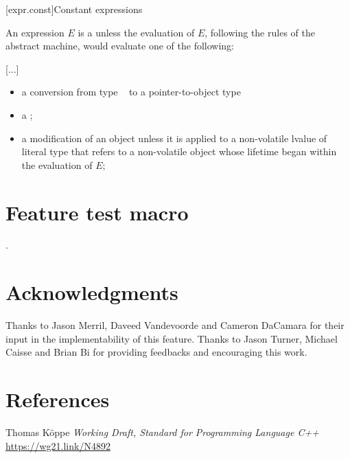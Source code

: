 \documentclass{wg21}
\begin{document}
    [expr.const]{Constant expressions}%

    \pnum
    An expression $E$ is a 
    unless the evaluation of $E$, following the rules of the abstract
    machine, would evaluate one of the following:

    \textcolor{noteclr}{[...]}
    \begin{itemize}
        \item
        a conversion from type ~ to a pointer-to-object type 


    \item
    a ;

    \item
    a modification of an object
    unless it is applied to a non-volatile lvalue of literal type
    that refers to a non-volatile object
    whose lifetime began within the evaluation of $E$;

\end{itemize}

\section{Feature test macro}

.


\section{Acknowledgments}

Thanks to Jason Merril, Daveed Vandevoorde and Cameron DaCamara for their input in the implementability of this feature.
Thanks to Jason Turner,  Michael Caisse and Brian Bi for providing feedbacks and encouraging this work.

\section{References}

\renewcommand{\section}[2]{}%



\begin{thebibliography}{9}

Thomas Köppe
\emph{Working Draft, Standard for Programming Language C++}\newline
\url{https://wg21.link/N4892}


\end{thebibliography}
\end{document}
